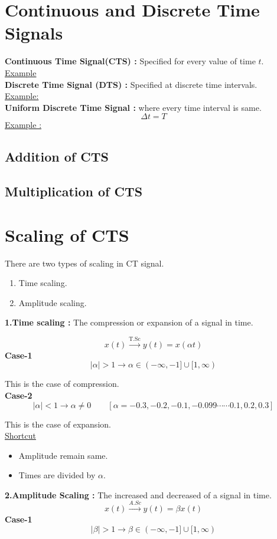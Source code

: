 \documentclass[a5paper,10pt]{report}
\begin{document}
\section{Continuous and Discrete Time Signals}
\textbf{Continuous Time Signal(CTS) : }Specified for every value of time $t$.\\
\underline{Example}\\


\textbf{Discrete Time Signal (DTS) :} Specified at discrete time intervals.\\
\underline{Example:}\\


\textbf{Uniform Discrete Time Signal :} where every time interval is same.
$$ \Delta t=T $$
\underline{Example :}


\subsection{Addition of CTS }


\subsection{Multiplication of CTS}

\section{Scaling of CTS}
There are two types of scaling in CT signal.
\begin{enumerate}
    \item Time scaling.
    \item Amplitude scaling.
\end{enumerate}
\textbf{1.Time scaling :} The compression or expansion of a signal in time.\par
\[ x(t) \xrightarrow{\text{T.Sc}} y(t)=x(\alpha t) \]
\textbf{Case-1}
\[
|\alpha| > 1 \longrightarrow \alpha\in (-\infty,-1]\cup[1,\infty)
\]

This is the case of compression.\\
\textbf{Case-2}
\[
|\alpha|<1 \longrightarrow \alpha \neq 0 \quad \quad[\alpha=-0.3,-0.2,-0.1,-0.099 \cdots\cdots 0.1,0.2,0.3]
\]


This is the case of expansion.\\
\underline{Shortcut} 
\begin{itemize}
    \item Amplitude remain same.
    \item Times are divided by $\alpha$.
\end{itemize}
\textbf{2.Amplitude Scaling :} The increased and decreased of a signal in time.
\[
x(t)\xrightarrow{A.Sc} y(t)=\beta x(t)
\]
\textbf{Case-1}
\[
|\beta | >1 \longrightarrow \beta \in(-\infty,-1]\cup [1,\infty)
\]
\end{document}
